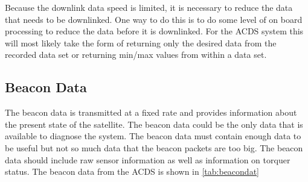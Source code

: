 Because the downlink data speed is limited, it is necessary to reduce the data that needs to be downlinked. One way to do this is to do some level of on board processing to reduce the data before it is downlinked. For the \ac{ACDS} system this will most likely take the form of returning only the desired data from the recorded data set or returning min/max values from within a data set. 

\subsection{Beacon Data}

The beacon data is transmitted at a fixed rate and provides information about the present state of the satellite. The beacon data could be the only data that is available to diagnose the system. The beacon data must contain enough data to be useful but not so much data that the beacon packets are too big. The beacon data should include raw sensor information as well as information on torquer status. The beacon data from the \ac{ACDS} is shown in \autoref{tab:beacondat}

